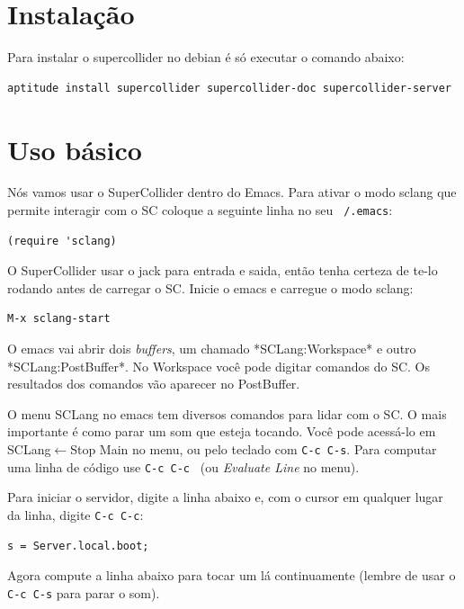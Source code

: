 \documentclass[12pt,brazil]{book}
\begin{document}
\section{Instalação}
\label{sec:instalacao-2}

Para instalar o supercollider no debian é só executar o comando
abaixo:

\begin{verbatim}
aptitude install supercollider supercollider-doc supercollider-server
\end{verbatim}

\section{Uso básico}
\label{sec:uso-basico-1}

Nós vamos usar o SuperCollider dentro do Emacs. Para ativar o modo
sclang que permite interagir com o SC coloque a seguinte linha no seu
\texttt{~/.emacs}:

\begin{verbatim}
(require 'sclang)
\end{verbatim}

O SuperCollider usar o jack para entrada e saida, então tenha certeza
de te-lo rodando antes de carregar o SC. Inicie o emacs e carregue o
modo sclang:

\begin{verbatim}
M-x sclang-start
\end{verbatim}

O emacs vai abrir dois \textit{buffers}, um chamado *SCLang:Workspace*
e outro *SCLang:PostBuffer*. No Workspace você pode digitar comandos
do SC. Os resultados dos comandos vão aparecer no PostBuffer.

O menu SCLang no emacs tem diversos comandos para lidar com o SC. O
mais importante é como parar um som que esteja tocando. Você pode
acessá-lo em SCLang$\leftarrow$Stop Main no menu, ou pelo teclado com
\texttt{C-c C-s}. Para computar uma linha de código use \texttt{C-c
  C-c } (ou \textit{Evaluate Line} no menu).

Para iniciar o servidor, digite a linha abaixo e, com o cursor em
qualquer lugar da linha, digite \texttt{C-c C-c}:

\begin{verbatim}
s = Server.local.boot;
\end{verbatim}

Agora compute a linha abaixo para tocar um lá continuamente (lembre de
usar o \texttt{C-c C-s} para parar o som).
\end{document}
